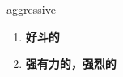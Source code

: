 
\begin{frame}
{\huge aggressive}
\begin{center}
\begin{enumerate}\Large
  \item \textbf{好斗的}
  \item \textbf{强有力的，强烈的}
\end{enumerate}
\end{center}
\end{frame}
